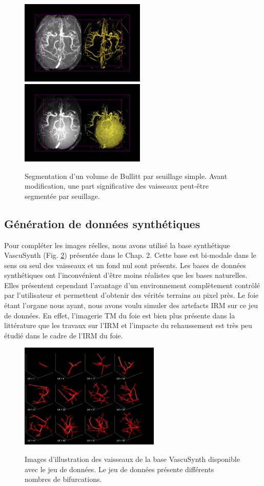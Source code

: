 \begin{figure}[h]
  \centering
  \includegraphics[height=4cm]{Images/threshold_bullitt.png}
  \includegraphics[height=4cm]{Images/threshold_bullitt_difficult.png}
  \caption{Segmentation d'un volume de Bullitt par seuillage simple. Avant modification, une part significative des vaisseaux peut-être segmentée par seuillage.}
  \label{fig:modifications_bullitt}
\end{figure}

\subsection{Génération de données synthétiques}

Pour compléter les images réelles, nous avons utilisé la base synthétique VascuSynth (Fig. \ref{fig:snap_vascu}) présentée dans le Chap. 2. Cette base est bi-modale dans le sens ou seul des vaisseaux et un fond nul sont présents. Les bases de données synthétiques ont l'inconvénient d'être moins réalistes que les bases naturelles. Elles présentent cependant l'avantage d'un environnement complètement contrôlé par l'utilisateur et permettent d'obtenir des vérités terrains au pixel près. Le foie étant l'organe nous ayant, nous avons voulu simuler des artefacts IRM sur ce jeu de données. En effet, l'imagerie TM du foie est bien plus présente dans la littérature que les travaux sur l'IRM et l'impacte du rehaussement est très peu étudié dans le cadre de l'IRM du foie.

\begin{figure}[h]
  \centering
  \includegraphics[height=5cm]{Images/snapVascu.png}
  \label{fig:snap_vascu}
  \caption{Images d'illustration des vaisseaux de la base VascuSynth disponible avec le jeu de données. Le jeu de données présente différents nombres de bifurcations.}
\end{figure}

